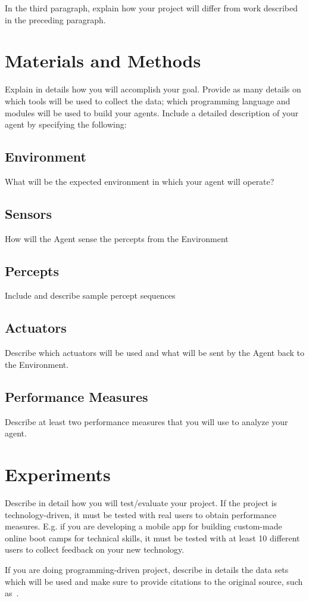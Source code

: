 \documentclass{article}
\begin{document}
In the third paragraph, explain how your project will differ from work described in the preceding paragraph. 

\section{Materials and Methods}
Explain in details how you will accomplish your goal.  Provide as many details on which tools will be used to collect the data; which programming language and modules will be used to build your agents.
Include a detailed description of your agent by specifying the following:
\subsection{Environment}
What will be the expected environment in which your agent will operate?
\subsection{Sensors}
How will the Agent sense the percepts from the Environment
\subsection{Percepts}
Include and describe sample percept sequences
\subsection{Actuators}
Describe which actuators will be used and what will be sent by the Agent back to the Environment.
\subsection{Performance Measures}
Describe at least two performance measures that you will use to analyze your agent.

\section{Experiments}
Describe in detail how you will test/evaluate your project.
If the project is technology-driven, it must be tested with real users to obtain performance measures.  E.g. if you are developing a mobile app for building custom-made online boot camps for technical skills, it must be tested with at least 10 different users to collect feedback on your new technology.

If you are doing programming-driven project, describe in details the data sets which will be used and make sure to provide citations to the original source, such as~\cite{knuthwebsite}. 

 

\end{document}
